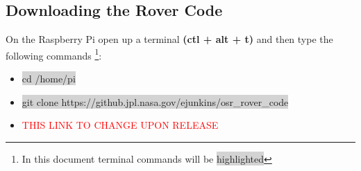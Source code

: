 \documentclass[12pt]{article}
\begin{document}
\subsection{Downloading the Rover Code}
On the Raspberry Pi open up a terminal \textbf{(ctl + alt + t)} and then type the following commands \footnote{In this document terminal commands will be \colorbox{lightgray}{highlighted}}:

\begin{itemize}
	\item[] \colorbox{lightgray}{cd /home/pi}
	\item[] \colorbox{lightgray}{git clone https://github.jpl.nasa.gov/ejunkins/osr\_rover\_code}
	\item[] \textcolor{red}{THIS LINK TO CHANGE UPON RELEASE}
\end{itemize}

%
%
%
\end{document}
